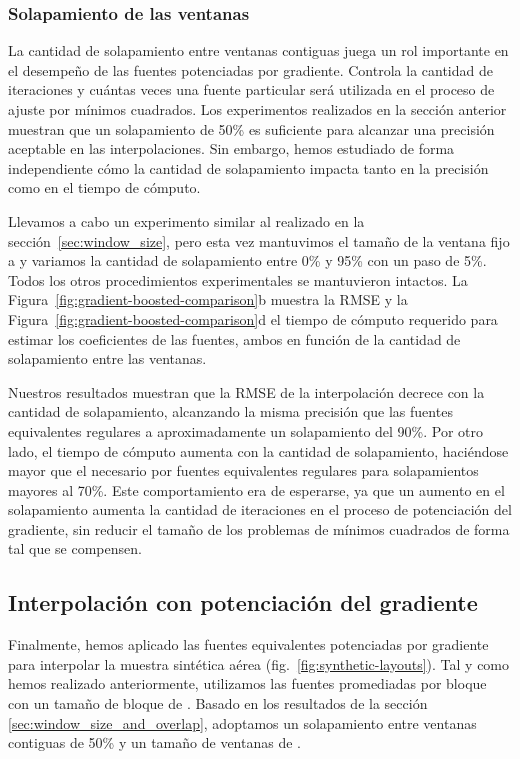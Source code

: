 \subsubsection{Solapamiento de las ventanas}

La cantidad de solapamiento entre ventanas contiguas juega un rol importante en
el desempeño de las fuentes potenciadas por gradiente.
Controla la cantidad de iteraciones y cuántas veces una fuente particular será
utilizada en el proceso de ajuste por mínimos cuadrados.
Los experimentos realizados en la sección anterior muestran que un solapamiento
de 50\% es suficiente para alcanzar una precisión aceptable en las
interpolaciones.
Sin embargo, hemos estudiado de forma independiente cómo la cantidad de
solapamiento impacta tanto en la precisión como en el tiempo de cómputo.

Llevamos a cabo un experimento similar al realizado en la
sección~\ref{sec:window_size}, pero esta vez mantuvimos el tamaño de la ventana
fijo a \BoostOverlappingWindowSize{} y variamos la cantidad de solapamiento
entre 0\% y 95\% con un paso de 5\%.
Todos los otros procedimientos experimentales se mantuvieron intactos.
La Figura~\ref{fig:gradient-boosted-comparison}b
muestra la \ac{RMSE} y la
Figura~\ref{fig:gradient-boosted-comparison}d
el tiempo de cómputo requerido para estimar los coeficientes de las fuentes,
ambos en función de la cantidad de solapamiento entre las ventanas.

Nuestros resultados muestran que la \ac{RMSE} de la interpolación decrece con
la cantidad de solapamiento, alcanzando la misma precisión que las fuentes
equivalentes regulares a aproximadamente un solapamiento del 90\%.
Por otro lado, el tiempo de cómputo aumenta con la cantidad de solapamiento,
haciéndose mayor que el necesario por fuentes equivalentes regulares para
solapamientos mayores al 70\%.
Este comportamiento era de esperarse, ya que un aumento en el solapamiento
aumenta la cantidad de iteraciones en el proceso de potenciación del gradiente,
sin reducir el tamaño de los problemas de mínimos cuadrados de forma tal que se
compensen.


\subsection{
    Interpolación con potenciación del gradiente
}
\label{sec:gb_interpolation}

Finalmente, hemos aplicado las fuentes equivalentes potenciadas por gradiente
para interpolar la muestra sintética aérea (fig.~\ref{fig:synthetic-layouts}).
Tal y como hemos realizado anteriormente, utilizamos las fuentes promediadas
por bloque con un tamaño de bloque de \EqlBoostAirborneSpacing{}.
Basado en los resultados de la sección \ref{sec:window_size_and_overlap},
adoptamos un solapamiento entre ventanas contiguas de 50\% y un tamaño de
ventanas de \EqlBoostAirborneWindowSize{}.

